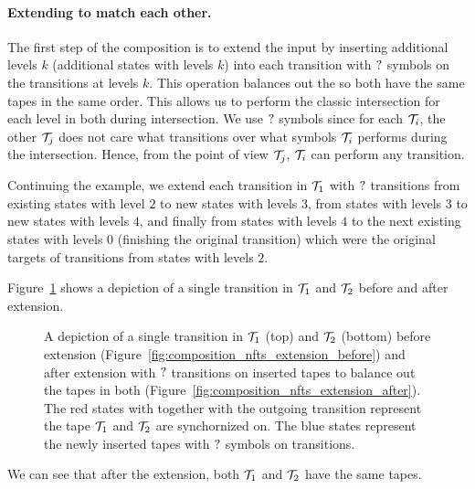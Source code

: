 \paragraph{Extending \nfts to match each other.}
The first step of the composition is to extend the input \nfts by inserting additional levels $k$ (additional states with levels $k$) into each transition with $?$ symbols on the transitions at levels $k$.
This operation balances out the \nfts so both have the same tapes in the same order.
This allows us to perform the classic \nfa intersection for each level in both \nfts during \nft intersection.
We use $?$ symbols since for each \nft $\mathcal{T}_i$, the other \nft $\mathcal{T}_j$ does not care what transitions over what symbols $\mathcal{T}_i$ performs during the intersection.
Hence, from the point of view $\mathcal{T}_j$, $\mathcal{T}_i$ can perform any transition.

\begin{example}
  Continuing the example, we extend each \nft transition in $\mathcal{T}_1$ with $?$ transitions from existing states with level $2$ to new states with levels $3$, from states with levels $3$ to new states with levels $4$, and finally from states with levels $4$ to the next existing states with levels $0$ (finishing the original \nft transition) which were the original targets of transitions from states with levels $2$.

  Figure~\ref{fig:composition_nfts_extension} shows a depiction of a single transition in $\mathcal{T}_1$ and $\mathcal{T}_2$ before and after extension.

  \begin{figure}[ht]
    \centering
    \qquad
    \caption{
      A depiction of a single transition in \nfts $\mathcal{T}_1$ (top) and $\mathcal{T}_2$ (bottom) before extension (Figure~\ref{fig:composition_nfts_extension_before}) and after extension with $?$ transitions on inserted tapes to balance out the tapes in both \nfts (Figure~\ref{fig:composition_nfts_extension_after}).
      The red states with together with the outgoing transition represent the tape $\mathcal{T}_1$ and $\mathcal{T}_2$ are synchornized on.
      The blue states represent the newly inserted tapes with $?$ symbols on transitions.
    }
    \label{fig:composition_nfts_extension}%
  \end{figure}

  We can see that after the extension, both $\mathcal{T}_1$ and $\mathcal{T}_2$ have the same tapes.
\end{example}

